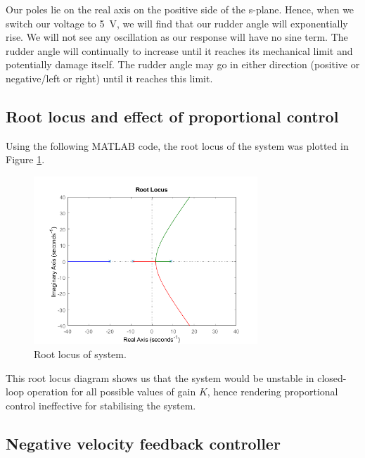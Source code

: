 \documentclass[11pt]{article}
\numberwithin{equation}{section}
\begin{document}
Our poles lie on the real axis on the positive side of the s-plane. Hence, when we switch our voltage to \SI{5}{\volt}, we will find that our rudder angle will exponentially rise. We will not see any oscillation as our response will have no sine term. The rudder angle will continually to increase until it reaches its mechanical limit and potentially damage itself. The rudder angle may go in either direction (positive or negative/left or right) until it reaches this limit.
\subsection{Root locus and effect of proportional control}
Using the following MATLAB code, the root locus of the system was plotted in Figure \ref{q3b}.

\begin{figure}[H]
    \centering
    \includegraphics[width = 0.75\textwidth]{./img/q3b.png}
    \caption{Root locus of system.}
    \label{q3b}
\end{figure}
This root locus diagram shows us that the system would be unstable in closed-loop operation for all possible values of gain $K$, hence rendering proportional control ineffective for stabilising the system.
\subsection{Negative velocity feedback controller}
\end{document}
